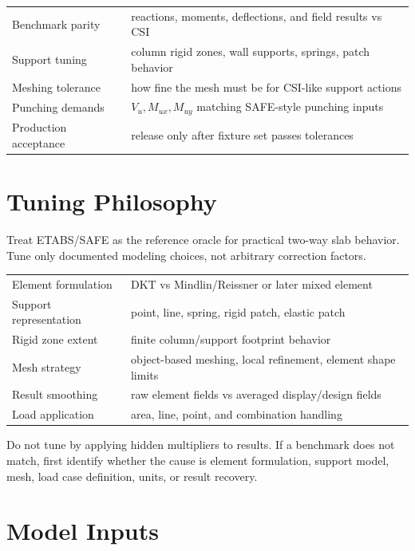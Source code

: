 \documentclass[10pt]{article}
\begin{document}

{\ttfamily\footnotesize
\begin{tabular}{@{}p{2.0in}p{4.5in}@{}}
Benchmark parity & reactions, moments, deflections, and field results vs CSI \\
Support tuning & column rigid zones, wall supports, springs, patch behavior \\
Meshing tolerance & how fine the mesh must be for CSI-like support actions \\
Punching demands & $V_u,M_{ux},M_{uy}$ matching SAFE-style punching inputs \\
Production acceptance & release only after fixture set passes tolerances \\
\end{tabular}
}

\section{Tuning Philosophy}

Treat ETABS/SAFE as the reference oracle for practical two-way slab behavior.
Tune only documented modeling choices, not arbitrary correction factors.


{\ttfamily\footnotesize
\begin{tabular}{@{}p{2.1in}p{4.4in}@{}}
Element formulation & DKT vs Mindlin/Reissner or later mixed element \\
Support representation & point, line, spring, rigid patch, elastic patch \\
Rigid zone extent & finite column/support footprint behavior \\
Mesh strategy & object-based meshing, local refinement, element shape limits \\
Result smoothing & raw element fields vs averaged display/design fields \\
Load application & area, line, point, and combination handling \\
\end{tabular}
}

Do not tune by applying hidden multipliers to results. If a benchmark does not
match, first identify whether the cause is element formulation, support model,
mesh, load case definition, units, or result recovery.

\section{Model Inputs}
\end{document}
